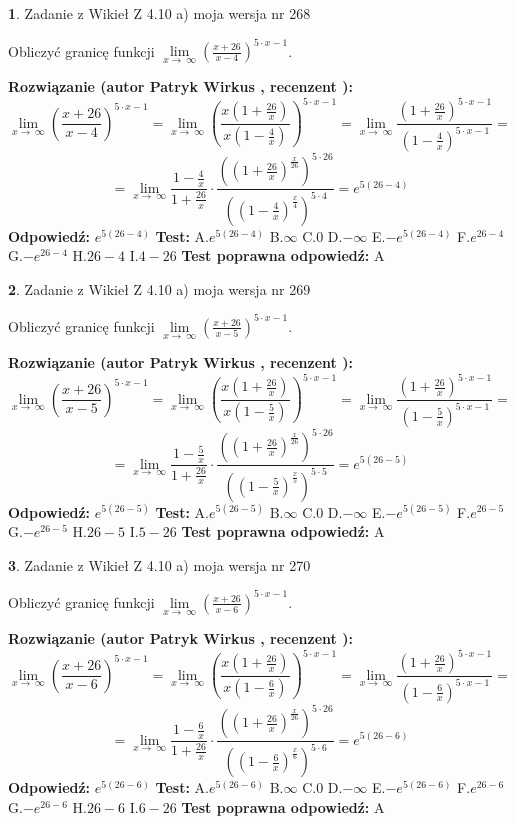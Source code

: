 \documentclass[12pt, a4paper]{article}
\theoremstyle{definition} %
\newtheorem{zad}{}
\newcommand{\zadStart}[1]{\begin{zad}#1\newline}
\newcommand{\zadStop}{\end{zad}}
\newcommand{\rozwStart}[2]{\noindent \textbf{Rozwiązanie (autor #1 , recenzent #2): }\newline}
\newcommand{\rozwStop}{\newline}
\newcommand{\odpStart}{\noindent \textbf{Odpowiedź:}\newline}
\newcommand{\odpStop}{\newline}
\newcommand{\testStart}{\noindent \textbf{Test:}\newline}
\newcommand{\testStop}{\newline}
\newcommand{\kluczStart}{\noindent \textbf{Test poprawna odpowiedź:}\newline}
\newcommand{\kluczStop}{\newline}
\begin{document}
\zadStart{Zadanie z Wikieł Z 4.10 a) moja wersja nr 268}


Obliczyć granicę funkcji  $\lim\limits_{x\to\ \infty}(\frac{x+26}{x-4})^{5\cdot x-1}$.
\zadStop
\rozwStart{Patryk Wirkus}{}
$$\lim\limits_{x\to\ \infty}(\frac{x+26}{x-4})^{5\cdot x-1} = \lim\limits_{x\to\ \infty}(\frac{x(1+\frac{26}{x})}{x(1-\frac{4}{x})})^{5\cdot x-1}=\lim\limits_{x\to\ \infty}\frac{(1+\frac{26}{x})^{5\cdot x-1}}{(1-\frac{4}{x})^{5\cdot x-1}}=$$
$$=\lim\limits_{x\to\ \infty}\frac{1-\frac{4}{x}}{1+\frac{26}{x}}\cdot\frac{((1+\frac{26}{x})^{\frac{x}{26}})^{5\cdot26}}{((1-\frac{4}{x})^{\frac{x}{4}})^{5\cdot4}}=e^{5(26-4)}$$
\rozwStop
\odpStart
$e^{5(26-4)}$
\odpStop
\testStart
A.$e^{5(26-4)}$ B.$\infty$ C.$0$ D.$-\infty$ E.$-e^{5(26-4)}$
F.$e^{26-4}$ G.$-e^{26-4}$
H.$26-4$
I.$4-26$
\testStop
\kluczStart
A
\kluczStop



\zadStart{Zadanie z Wikieł Z 4.10 a) moja wersja nr 269}


Obliczyć granicę funkcji  $\lim\limits_{x\to\ \infty}(\frac{x+26}{x-5})^{5\cdot x-1}$.
\zadStop
\rozwStart{Patryk Wirkus}{}
$$\lim\limits_{x\to\ \infty}(\frac{x+26}{x-5})^{5\cdot x-1} = \lim\limits_{x\to\ \infty}(\frac{x(1+\frac{26}{x})}{x(1-\frac{5}{x})})^{5\cdot x-1}=\lim\limits_{x\to\ \infty}\frac{(1+\frac{26}{x})^{5\cdot x-1}}{(1-\frac{5}{x})^{5\cdot x-1}}=$$
$$=\lim\limits_{x\to\ \infty}\frac{1-\frac{5}{x}}{1+\frac{26}{x}}\cdot\frac{((1+\frac{26}{x})^{\frac{x}{26}})^{5\cdot26}}{((1-\frac{5}{x})^{\frac{x}{5}})^{5\cdot5}}=e^{5(26-5)}$$
\rozwStop
\odpStart
$e^{5(26-5)}$
\odpStop
\testStart
A.$e^{5(26-5)}$ B.$\infty$ C.$0$ D.$-\infty$ E.$-e^{5(26-5)}$
F.$e^{26-5}$ G.$-e^{26-5}$
H.$26-5$
I.$5-26$
\testStop
\kluczStart
A
\kluczStop



\zadStart{Zadanie z Wikieł Z 4.10 a) moja wersja nr 270}


Obliczyć granicę funkcji  $\lim\limits_{x\to\ \infty}(\frac{x+26}{x-6})^{5\cdot x-1}$.
\zadStop
\rozwStart{Patryk Wirkus}{}
$$\lim\limits_{x\to\ \infty}(\frac{x+26}{x-6})^{5\cdot x-1} = \lim\limits_{x\to\ \infty}(\frac{x(1+\frac{26}{x})}{x(1-\frac{6}{x})})^{5\cdot x-1}=\lim\limits_{x\to\ \infty}\frac{(1+\frac{26}{x})^{5\cdot x-1}}{(1-\frac{6}{x})^{5\cdot x-1}}=$$
$$=\lim\limits_{x\to\ \infty}\frac{1-\frac{6}{x}}{1+\frac{26}{x}}\cdot\frac{((1+\frac{26}{x})^{\frac{x}{26}})^{5\cdot26}}{((1-\frac{6}{x})^{\frac{x}{6}})^{5\cdot6}}=e^{5(26-6)}$$
\rozwStop
\odpStart
$e^{5(26-6)}$
\odpStop
\testStart
A.$e^{5(26-6)}$ B.$\infty$ C.$0$ D.$-\infty$ E.$-e^{5(26-6)}$
F.$e^{26-6}$ G.$-e^{26-6}$
H.$26-6$
I.$6-26$
\testStop
\kluczStart
A
\kluczStop
\end{document}
